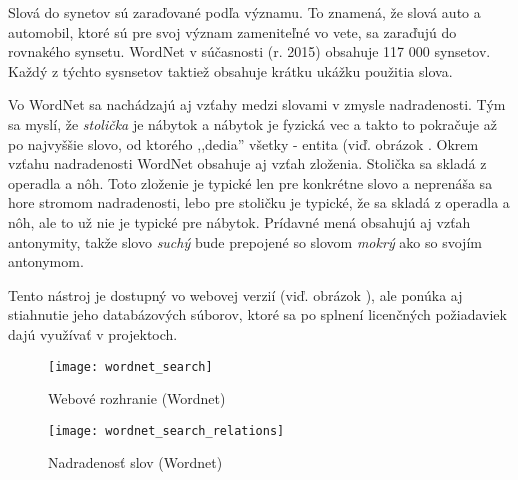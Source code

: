 Slová do synetov sú zaraďované podľa významu. To znamená, že slová auto a automobil, ktoré sú pre svoj význam zameniteľné vo vete, sa zaraďujú do rovnakého synsetu. WordNet v súčasnosti (r. 2015) obsahuje 117 000 synsetov. Každý z týchto sysnsetov taktiež obsahuje krátku ukážku použitia slova.

Vo WordNet sa nachádzajú aj vzťahy medzi slovami v zmysle nadradenosti. Tým sa myslí, že \textit{stolička} je nábytok a nábytok je fyzická vec a takto to pokračuje až po najvyššie slovo, od ktorého ,,dedia'' všetky - entita (viď. obrázok . Okrem vzťahu nadradenosti WordNet obsahuje aj vzťah zloženia. Stolička sa skladá z operadla a nôh. Toto zloženie je typické len pre konkrétne slovo a neprenáša sa hore stromom nadradenosti,   lebo pre stoličku je typické, že sa skladá z operadla a nôh, ale to už nie je typické pre nábytok.
Prídavné mená obsahujú aj vzťah antonymity, takže slovo \textit{suchý} bude prepojené so slovom \textit{mokrý} ako so svojím antonymom.

Tento nástroj je dostupný vo webovej verzií (viď. obrázok ), ale ponúka aj stiahnutie jeho databázových súborov, ktoré sa po splnení licenčných požiadaviek dajú využívať v projektoch.

\begin{figure}[H]
\begin{center}\texttt{[image: wordnet\_search]}\end{center}
\caption[Webové rozhranie]{Webové rozhranie (Wordnet)}\label{fig:wordnet_search}
\end{figure}

\begin{figure}[H]
\begin{center}\texttt{[image: wordnet\_search\_relations]}\end{center}
\caption[Nadradenosť slov]{Nadradenosť slov (Wordnet)}\label{fig:wordnet_relations}
\end{figure}

